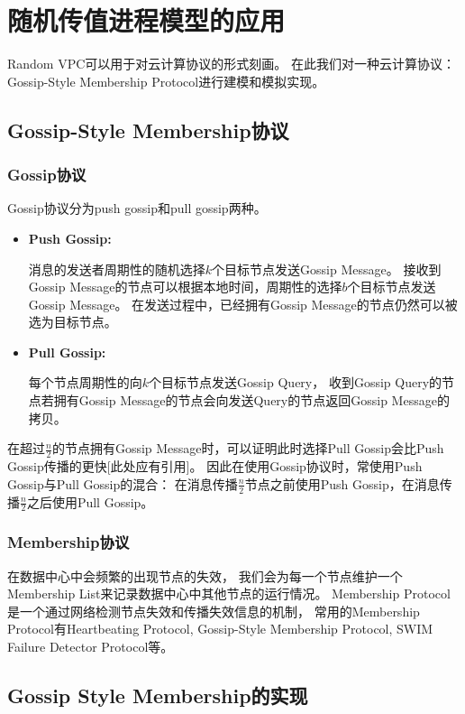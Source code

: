 
\chapter{随机传值进程模型的应用}

Random VPC可以用于对云计算协议的形式刻画。
在此我们对一种云计算协议：Gossip-Style Membership Protocol进行建模和模拟实现。

\section{Gossip-Style Membership协议}
\subsection{Gossip协议}
Gossip协议分为push gossip和pull gossip两种。
\begin{itemize}
   \item {
      \textbf{Push Gossip:} 
      
      消息的发送者周期性的随机选择$k$个目标节点发送Gossip Message。
      接收到Gossip Message的节点可以根据本地时间，周期性的选择$b$个目标节点发送Gossip Message。
      在发送过程中，已经拥有Gossip Message的节点仍然可以被选为目标节点。
   }
   \item {
      \textbf{Pull Gossip:}

      每个节点周期性的向$k$个目标节点发送Gossip Query，
      收到Gossip Query的节点若拥有Gossip Message的节点会向发送Query的节点返回Gossip Message的拷贝。
   }
\end{itemize}

在超过$\frac{n}{2}$的节点拥有Gossip Message时，可以证明此时选择Pull Gossip会比Push Gossip传播的更快[此处应有引用]。
因此在使用Gossip协议时，常使用Push Gossip与Pull Gossip的混合：
在消息传播$\frac{n}{2}$节点之前使用Push Gossip，在消息传播$\frac{n}{2}$之后使用Pull Gossip。

\subsection{Membership协议}

在数据中心中会频繁的出现节点的失效，
我们会为每一个节点维护一个Membership List来记录数据中心中其他节点的运行情况。
Membership Protocol是一个通过网络检测节点失效和传播失效信息的机制，
常用的Membership Protocol有Heartbeating Protocol, Gossip-Style Membership Protocol, SWIM Failure Detector Protocol等。

\section{Gossip Style Membership的实现}
